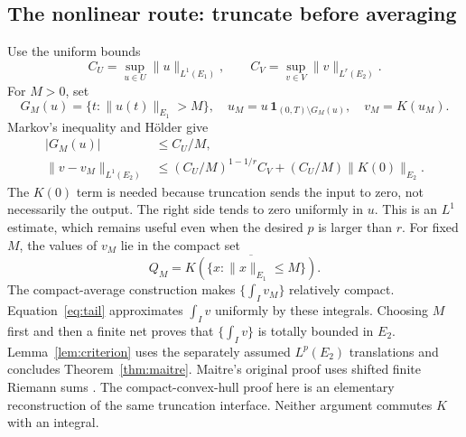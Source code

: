 \documentclass[12pt,reqno]{amsart}
\begin{document}
\subsection{The nonlinear route: truncate before averaging}
Use the uniform bounds
\[
C_U=\sup_{u\in U}\|u\|_{L^1(E_1)},\qquad
C_V=\sup_{v\in V}\|v\|_{L^r(E_2)}.
\]
For $M>0$, set
\[
G_M(u)=\{t:\|u(t)\|_{E_1}>M\},\quad
u_M=u\,\mathbf1_{(0,T)\setminus G_M(u)},\quad v_M=K(u_M).
\]
Markov's inequality and H\"older give
\begin{align}
|G_M(u)|&\le C_U/M,\label{eq:badset}\\
\|v-v_M\|_{L^1(E_2)}
&\le (C_U/M)^{1-1/r}C_V+(C_U/M)\|K(0)\|_{E_2}.
\label{eq:tail}
\end{align}
The $K(0)$ term is needed because truncation sends the input to zero, not necessarily the output. The right side tends to zero uniformly in $u$. This is an $L^1$ estimate, which remains useful even when the desired $p$ is larger than $r$.
For fixed $M$, the values of $v_M$ lie in the compact set
\[
Q_M=\overline{K(\{x:\|x\|_{E_1}\le M\})}.
\]
The compact-average construction makes $\{\int_Iv_M\}$ relatively compact. Equation~\eqref{eq:tail} approximates $\int_Iv$ uniformly by these integrals. Choosing $M$ first and then a finite net proves that $\{\int_Iv\}$ is totally bounded in $E_2$. Lemma~\ref{lem:criterion} uses the separately assumed $L^p(E_2)$ translations and concludes Theorem~\ref{thm:maitre}.
Maitre's original proof uses shifted finite Riemann sums \cite[Lemma 2.3, equations (2.3)--(2.24), pp.~1726--1730]{S-maitre}. The compact-convex-hull proof here is an elementary reconstruction of the same truncation interface. Neither argument commutes $K$ with an integral.
\end{document}
